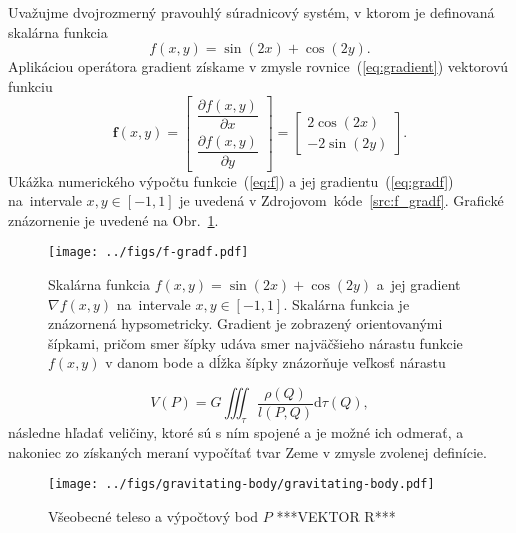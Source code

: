 \documentclass[a4paper, 12pt]{book}
\newcommand{\diff}{\mathrm d}
\let\vec\mathbf
\begin{document}
Uvažujme dvojrozmerný pravouhlý súradnicový systém, v ktorom je definovaná 
skalárna funkcia
%
\begin{equation}
\label{eq:f}
f(x, y) = \sin(2x) + \cos(2y){.}
\end{equation}
%
Aplikáciou operátora gradient získame v zmysle rovnice~(\ref{eq:gradient}) 
vektorovú funkciu
%
\begin{equation}
\label{eq:gradf}
\vec f(x, y) =
\begin{bmatrix}
\dfrac{\partial f(x, y)}{\partial x} \\[2ex]
\dfrac{\partial f(x, y)}{\partial y}
\end{bmatrix}
=
\begin{bmatrix}
2 \cos(2x) \\[2ex]
-2 \sin(2y)
\end{bmatrix}
{.}
\end{equation}
%
Ukážka numerického výpočtu funkcie~(\ref{eq:f}) a jej 
gradientu~(\ref{eq:gradf}) na~intervale $x, y \in [-1, 1]$ je uvedená 
v Zdrojovom~kóde~\ref{src:f_gradf}.  Grafické znázornenie je uvedené na 
Obr.~\ref{fig:f_gradf}.



\begin{figure}[bt]
\centering
\texttt{[image: ../figs/f-gradf.pdf]}
\caption{Skalárna funkcia $f(x, y) = \sin(2x) + \cos(2y)$ a~jej gradient 
$\nabla f(x, y)$ na~intervale $x, y \in [-1, 1]$.  Skalárna funkcia je 
znázornená hypsometricky.  Gradient je zobrazený orientovanými šípkami, pričom 
smer šípky udáva smer najväčšieho nárastu funkcie $f(x, y)$ v danom bode 
a dĺžka šípky znázorňuje veľkosť nárastu}
\label{fig:f_gradf}
\end{figure}


%
\begin{equation}
\label{eq:newton}
V(P) = G \iiint_{\tau} \frac{\rho(Q)}{l(P, Q)} \diff \tau(Q){,}
\end{equation}
%
následne hľadať veličiny, ktoré sú s ním spojené a je možné ich odmerať, 
a nakoniec zo získaných meraní vypočítať tvar Zeme v zmysle zvolenej definície.

\begin{figure}[bt]
\centering
\texttt{[image: ../figs/gravitating-body/gravitating-body.pdf]}
\caption{Všeobecné teleso a výpočtový bod $P$ ***VEKTOR R***}
\end{figure}
\end{document}
